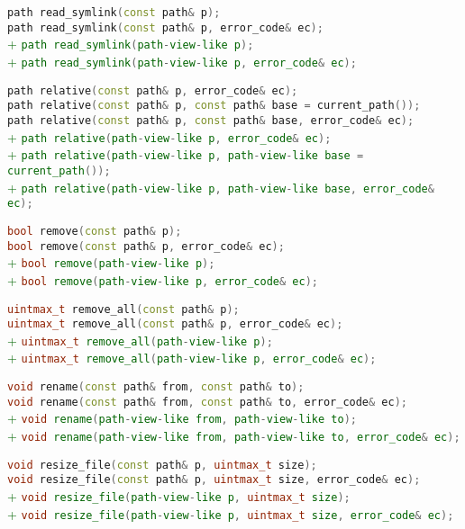 \documentclass[11pt]{article}
\newcommand{\code}[2][cpp]{\lstinline[language=#1,basicstyle=\small\ttfamily]{#2}}
\newcommand{\tsreplace}[3]{\textcolor{red}{\sout{#1}}#2\textcolor{darkgreen}{#3}}
\begin{document}
\tsreplace{}{  \code{path read_symlink(const path& p);}}{}\\
\tsreplace{}{  \code{path read_symlink(const path& p, error_code& ec);}}{}\\
\tsreplace{}{}{+ \code{path read_symlink(path-view-like p);}}\\
\tsreplace{}{}{+ \code{path read_symlink(path-view-like p, error_code& ec);}}

\tsreplace{}{  \code{path relative(const path& p, error_code& ec);}}{}\\
\tsreplace{}{  \code{path relative(const path& p, const path& base = current_path());}}{}\\
\tsreplace{}{  \code{path relative(const path& p, const path& base, error_code& ec);}}{}\\
\tsreplace{}{}{+ \code{path relative(path-view-like p, error_code& ec);}}\\
\tsreplace{}{}{+ \code{path relative(path-view-like p, path-view-like base = current_path());}}\\
\tsreplace{}{}{+ \code{path relative(path-view-like p, path-view-like base, error_code& ec);}}

\tsreplace{}{  \code{bool remove(const path& p);}}{}\\
\tsreplace{}{  \code{bool remove(const path& p, error_code& ec);}}{}\\
\tsreplace{}{}{+ \code{bool remove(path-view-like p);}}\\
\tsreplace{}{}{+ \code{bool remove(path-view-like p, error_code& ec);}}

\tsreplace{}{  \code{uintmax_t remove_all(const path& p);}}{}\\
\tsreplace{}{  \code{uintmax_t remove_all(const path& p, error_code& ec);}}{}\\
\tsreplace{}{}{+ \code{uintmax_t remove_all(path-view-like p);}}\\
\tsreplace{}{}{+ \code{uintmax_t remove_all(path-view-like p, error_code& ec);}}

\tsreplace{}{  \code{void rename(const path& from, const path& to);}}{}\\
\tsreplace{}{  \code{void rename(const path& from, const path& to, error_code& ec);}}{}\\
\tsreplace{}{}{+ \code{void rename(path-view-like from, path-view-like to);}}\\
\tsreplace{}{}{+ \code{void rename(path-view-like from, path-view-like to, error_code& ec);}}

\tsreplace{}{  \code{void resize_file(const path& p, uintmax_t size);}}{}\\
\tsreplace{}{  \code{void resize_file(const path& p, uintmax_t size, error_code& ec);}}{}\\
\tsreplace{}{}{+ \code{void resize_file(path-view-like p, uintmax_t size);}}\\
\tsreplace{}{}{+ \code{void resize_file(path-view-like p, uintmax_t size, error_code& ec);}}
\end{document}
